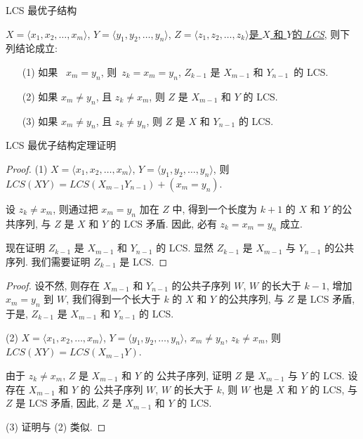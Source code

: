 \documentclass[fontset=fandol,UTF8,fleqn]{beamer}
\begin{document}
\begin{frame}{LCS 最优子结构}
\begin{theorem}
  $X =\langle x_1, x_2,\ldots, x_m\rangle$, $ Y = \langle y_1, y_2,\ldots, y_n\rangle$, \underline{$Z =\langle z_1, z_2,\ldots , z_k\rangle$是 $X$ 和 $Y$的 \textit{LCS}}, 则下列结论成立: 
\end{theorem}
  \begin{itemize}[<+-|alert@+>]
\item[(1)] 如果~ $x_m = y_n$, 则~$z_k = x_m = y_n$, 
  $Z_{k-1}$ 是 $X_{m-1}$ 和 $Y_{n-1}$~的 LCS. 
\item[(2)] 如果 $x_m\neq y_n$, 且 $z_k\neq x_m$, 则 $Z$ 是 $X_{m-1}$ 和 $Y$ 的 LCS. 
\item[(3)] 如果 $x_m\neq y_n$, 且 $z_k\neq y_n$, 则 $Z$ 是 $X$ 和 $Y_{n-1}$ 的 LCS. 
\end{itemize}
\end{frame}

\begin{frame}{LCS 最优子结构定理证明}
\begin{proof}
(1) $X =\langle x_1, x_2,\ldots, x_m\rangle$, $ Y = \langle y_1,
y_2,\ldots, y_n\rangle$, 则 $LCS(XY)=LCS(X_{m-1}Y_{n-1})+ (x_m=y_n)$. 

设 $z_k\neq x_m$, 则通过把 $x_m = y_n$ 加在 $Z$ 中, 得到一个长度为 $k+1$ 的 $X$ 和 $Y$ 的公共序列, 与 $Z$ 是 $X$ 和 $Y$ 的 LCS 矛盾. 因此, 必有 $z_k = x_m =
y_n$ 成立.  

现在证明 $Z_{k-1}$ 是 $X_{m-1}$ 和 $Y_{n-1}$ 的 LCS. 显然 $Z_{k-1}$ 是 $X_{m-1}$ 与 $Y_{n-1}$ 的公共序列. 我们需要证明 $Z_{k-1}$ 是 LCS.  
\end{proof}
\end{frame}

\begin{frame}{}
  \begin{proof}
设不然, 则存在 $X_{m-1}$ 和 $Y_{n-1}$ 的公共子序列 $W$, $W$ 的长大于 $k-1$, 增加 $x_m=y_n$ 到 $W$, 我们得到一个长大于 $k$ 的  $X$ 和 $Y$ 的公共序列, 与 $Z$ 是 LCS 矛盾, 于是, $Z_{k-1}$ 是 $X_{m-1}$ 和 $Y_{n-1}$ 的 LCS. 

(2) $X =\langle x_1, x_2,\ldots, x_m\rangle$, $ Y = \langle y_1,
y_2,\ldots, y_n\rangle$, $x_m\neq y_n$, $z_k\neq x_m$, 则 $LCS(XY)=LCS(X_{m-1}Y)$. 

 由于 $z_k\neq x_m$,  $Z$ 是 $X_{m-1}$ 和 $Y$ 的 公共子序列, 证明 $Z$ 是 $X_{m-1}$ 与 $Y$ 的 LCS. 设存在 $X_{m-1}$ 和 $Y$ 的 公共子序列 $W$, $W$ 的长大于 $k$, 则 $W$ 也是 $X$ 和 $Y$ 的 LCS, 与 $Z$ 是 LCS 矛盾, 因此, $Z$ 是 $X_{m-1}$ 和 $Y$ 的 LCS. 

(3) 证明与 (2) 类似. 
\end{proof}
\end{frame}
\end{document}
